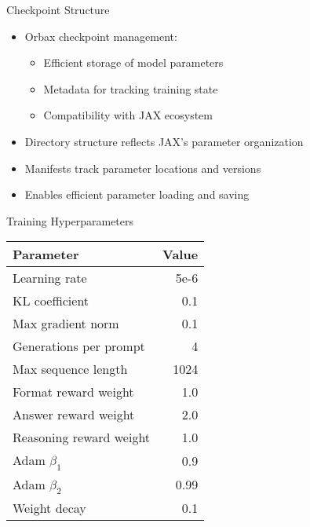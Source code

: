 \documentclass{beamer}
\begin{document}
\begin{frame}{Checkpoint Structure}
  \begin{itemize}
    \item Orbax checkpoint management:
    \begin{itemize}
      \item Efficient storage of model parameters
      \item Metadata for tracking training state
      \item Compatibility with JAX ecosystem
    \end{itemize}
    \item Directory structure reflects JAX's parameter organization
    \item Manifests track parameter locations and versions
    \item Enables efficient parameter loading and saving
  \end{itemize}
\end{frame}

\begin{frame}{Training Hyperparameters}
  \begin{center}
    \begin{tabular}{lr}
      \toprule
      \textbf{Parameter} & \textbf{Value} \\
      \midrule
      Learning rate & 5e-6 \\
      KL coefficient & 0.1 \\
      Max gradient norm & 0.1 \\
      Generations per prompt & 4 \\
      Max sequence length & 1024 \\
      Format reward weight & 1.0 \\
      Answer reward weight & 2.0 \\
      Reasoning reward weight & 1.0 \\
      Adam $\beta_1$ & 0.9 \\
      Adam $\beta_2$ & 0.99 \\
      Weight decay & 0.1 \\
      \bottomrule
    \end{tabular}
  \end{center}
\end{frame}
\end{document}
